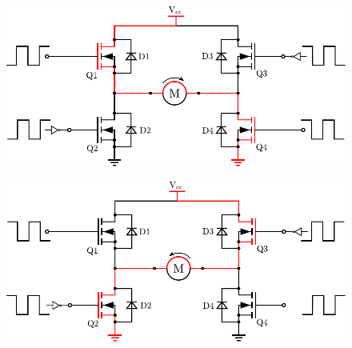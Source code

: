   \begin{minipage}{\linewidth}
  	\begin{minipage}{0.45\linewidth}
  		\begin{figure}[H]
  			\includegraphics[scale=.53]{figures/HbridgeClockwise4Q.pdf}
  			\centering
  			\vspace{-.4cm}
  			\captionsetup{justification=centering}
  			\label{HbridgeClokwise4Q}
  		\end{figure}\vspace{-5mm}
  	\end{minipage}
  	\hspace{0.03\linewidth}
  	\begin{minipage}{0.45\linewidth}
  		\begin{figure}[H]
  			\includegraphics[scale=.53]{figures/HbridgeCounterClockwise4Q.pdf}
  			\centering
  			\vspace{-.4cm}
  			\captionsetup{justification=centering}
  			\label{HbridgeCounterClokwise4Q}
  		\end{figure}\vspace{-5mm}
  	\end{minipage}
  \end{minipage}

\pagebreak